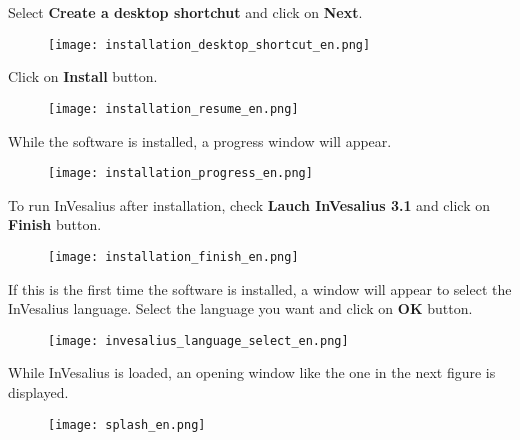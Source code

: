 \hspace{.2cm}

Select \textbf{Create a desktop shortchut} and click on \textbf{Next}.

\begin{figure}[!htb]
\centering
\texttt{[image: installation\_desktop\_shortcut\_en.png]}
\end{figure}

\newpage

Click on \textbf{Install} button.

\begin{figure}[!htb]
\centering
\texttt{[image: installation\_resume\_en.png]}
\end{figure}

\hspace{.2cm}

While the software is installed, a progress window will appear.

\begin{figure}[!htb]
\centering
\texttt{[image: installation\_progress\_en.png]}
\end{figure}

\newpage

To run InVesalius after installation, check \textbf{Lauch InVesalius 3.1} and click on \textbf{Finish} button.

\begin{figure}[!htb]
\centering
\texttt{[image: installation\_finish\_en.png]}
\end{figure}

\hspace{.2cm}

If this is the first time the software is installed, a window will appear to select the InVesalius language. Select the language you want and click on \textbf{OK} button.

\begin{figure}[!htb]
\centering
\texttt{[image: invesalius\_language\_select\_en.png]}
\end{figure}

\newpage

While InVesalius is loaded, an opening window like the one in the next figure is displayed.

\begin{figure}[!htb]
\centering
\texttt{[image: splash\_en.png]}
\end{figure}

\hspace{.2cm}

